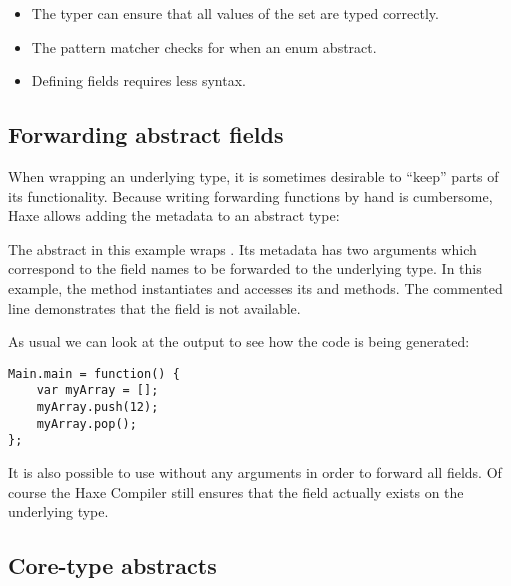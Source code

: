 \begin{itemize}
	\item The typer can ensure that all values of the set are typed correctly.
	\item The pattern matcher checks for  when  an enum abstract.
	\item Defining fields requires less syntax.
\end{itemize}


\subsection{Forwarding abstract fields}
\label{types-abstract-forward}

When wrapping an underlying type, it is sometimes desirable to ``keep'' parts of its functionality. Because writing forwarding functions by hand is cumbersome, Haxe allows adding the  metadata to an abstract type:


The  abstract in this example wraps . Its  metadata has two arguments which correspond to the field names to be forwarded to the underlying type. In this example, the  method instantiates  and accesses its  and  methods. The commented line demonstrates that the  field is not available.

As usual we can look at the  output to see how the code is being generated:

\begin{lstlisting}
Main.main = function() {
	var myArray = [];
	myArray.push(12);
	myArray.pop();
};
\end{lstlisting}

It is also possible to use  without any arguments in order to forward all fields. Of course the Haxe Compiler still ensures that the field actually exists on the underlying type.



\subsection{Core-type abstracts}
\label{types-abstract-core-type}

